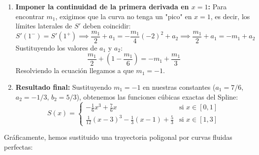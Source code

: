 {\begin{enumerate}
        \item \textbf{Imponer la continuidad de la primera derivada en $x=1$:}
        Para encontrar $m_1$, exigimos que la curva no tenga un "pico" en $x=1$, es decir, los límites laterales de $S'$ deben coincidir:
        \[
            S'(1^-) = S'(1^+) \implies \frac{m_1}{2} + a_1 = - \frac{m_1}{4}(-2)^2 + a_2 \implies \frac{m_1}{2} + a_1 = -m_1 + a_2
        \]
        Sustituyendo los valores de $a_1$ y $a_2$:
        \[
            \frac{m_1}{2} + \left(1 - \frac{m_1}{6}\right) = -m_1 + \frac{m_1}{3}
        \]
        Resolviendo la ecuación llegamos a que $\boxed{m_1 = -1}$.
        
        \item \textbf{Resultado final:}
        Sustituyendo $m_1 = -1$ en nuestras constantes ($a_1 = 7/6$, $a_2 = -1/3$, $b_2 = 5/3$), obtenemos las funciones cúbicas exactas del Spline:
        \[
            S(x) = 
            \begin{cases}
                -\frac{1}{6} x^3 + \frac{7}{6} x & \text{si } x \in [0,1] \\
                \frac{1}{12} (x-3)^3 - \frac{1}{3} (x-1) + \frac{5}{3} & \text{si } x \in [1,3]
            \end{cases}
        \]
    \end{enumerate}

    Gráficamente, hemos sustituido una trayectoria poligonal por curvas fluidas perfectas:
    \begin{center}
    \end{center}
}